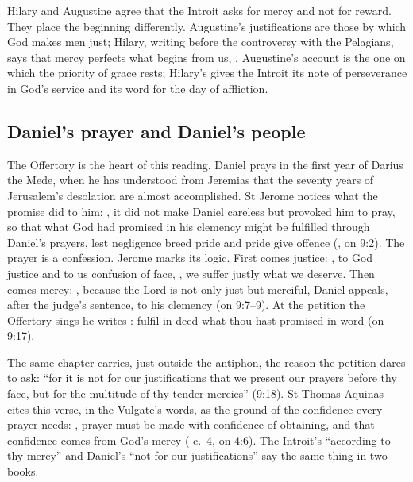 Hilary and Augustine agree that the Introit asks for mercy and not for reward.
They place the beginning differently. Augustine's justifications are those by
which God makes men just; Hilary, writing before the controversy with the
Pelagians, says that mercy perfects what begins from us, . Augustine's account is the one on which the
priority of grace rests; Hilary's gives the Introit its note of perseverance
in God's service and its word for the day of affliction.

\subsection{Daniel's prayer and Daniel's people}

The Offertory is the heart of this reading. Daniel prays in the first year of
Darius the Mede, when he has understood from Jeremias that the seventy years of
Jerusalem's desolation are almost accomplished. St Jerome notices what the
promise did to him: , it did not make Daniel careless but provoked him to
pray, so that what God had promised in his clemency might be fulfilled
through Daniel's prayers, lest negligence breed pride and pride give offence
(, on 9:2). The prayer is a confession. Jerome
marks its logic. First comes justice: , to God
justice and to us confusion of face, ,
we suffer justly what we deserve. Then comes mercy: , because the Lord is
not only just but merciful, Daniel appeals, after the judge's sentence, to his
clemency (on 9:7--9). At the petition the Offertory sings he writes
: fulfil in deed what thou hast
promised in word (on 9:17).

The same chapter carries, just outside the antiphon, the reason the
petition dares to ask: ``for it is not for our justifications that we present
our prayers before thy face, but for the multitude of thy tender mercies''
(9:18). St Thomas Aquinas cites this verse, in the Vulgate's words, as the
ground of the confidence every prayer needs: , prayer must be made with confidence of
obtaining, and that confidence comes from God's mercy ( c.~4, on 4:6). The Introit's ``according to thy mercy'' and Daniel's ``not for our
justifications'' say the same thing in two books.

